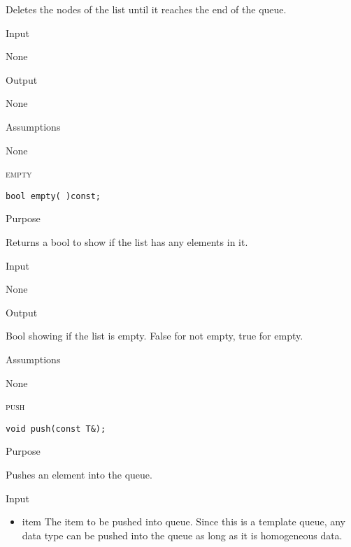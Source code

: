 \documentclass[pdftex, 11pt]{article}
\begin{document}
\begin{description}
\begin{description}
				Deletes the nodes of the list until it reaches
				the end of the queue.

			\item{Input}

				None

			\item{Output}
				
				None

			\item{Assumptions}

				None

		\end{description}
	\item{\textsc{empty}}

		\begin{lstlisting}
bool empty( )const;
		\end{lstlisting}

		\begin{description}
			\item{Purpose}
				
				Returns a bool to show if the list has any
				elements in it.

			\item{Input}

				None

			\item{Output}
				
				Bool showing if the list is empty. False for not
				empty, true for empty.

			\item{Assumptions}

				None

		\end{description}
	\item{\textsc{push}}

		\begin{lstlisting}
void push(const T&);
		\end{lstlisting}

		\begin{description}
			\item{Purpose}
				
				Pushes an element into the queue.

			\item{Input}

				\begin{itemize}
					\item{item}
						The item to be pushed into
						queue. Since this is a template
						queue, any data type can be
						pushed into the queue as long as
						it is homogeneous data.
				\end{itemize}


\end{description}
\end{description}
\end{document}
